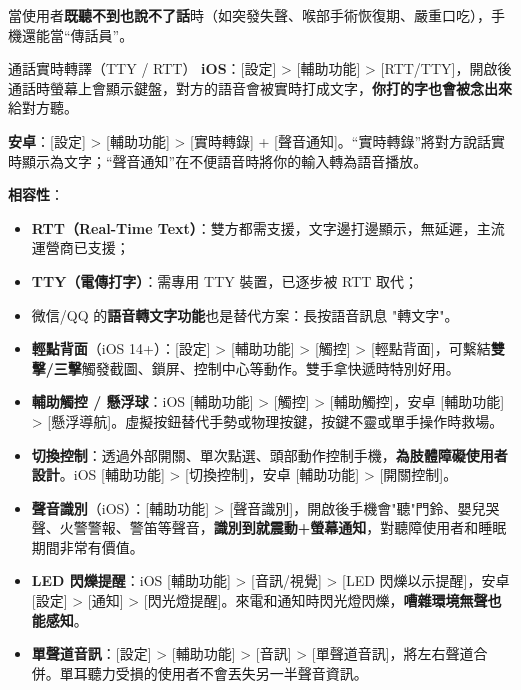
當使用者\textbf{既聽不到也說不了話}時（如突發失聲、喉部手術恢復期、嚴重口吃），手機還能當“傳話員”。

\begin{tcbinfo}{通話實時轉譯（TTY / RTT）}
\textbf{iOS}：[設定] > [輔助功能] > [RTT/TTY]，開啟後通話時螢幕上會顯示鍵盤，對方的語音會被實時打成文字，\textbf{你打的字也會被念出來}給對方聽。

\textbf{安卓}：[設定] > [輔助功能] > [實時轉錄] + [聲音通知]。“實時轉錄”將對方說話實時顯示為文字；“聲音通知”在不便語音時將你的輸入轉為語音播放。

\textbf{相容性}：

\begin{itemize}
  \item \textbf{RTT（Real-Time Text）}：雙方都需支援，文字邊打邊顯示，無延遲，主流運營商已支援；
  \item \textbf{TTY（電傳打字）}：需專用 TTY 裝置，已逐步被 RTT 取代；
  \item 微信/QQ 的\textbf{語音轉文字功能}也是替代方案：長按語音訊息 "轉文字"。
\end{itemize}

\end{tcbinfo}


\begin{itemize}
  \item \textbf{輕點背面}（iOS 14+）：[設定] > [輔助功能] > [觸控] > [輕點背面]，可繫結\textbf{雙擊/三擊}觸發截圖、鎖屏、控制中心等動作。雙手拿快遞時特別好用。
  \item \textbf{輔助觸控 / 懸浮球}：iOS [輔助功能] > [觸控] > [輔助觸控]，安卓 [輔助功能] > [懸浮導航]。虛擬按鈕替代手勢或物理按鍵，按鍵不靈或單手操作時救場。
  \item \textbf{切換控制}：透過外部開關、單次點選、頭部動作控制手機，\textbf{為肢體障礙使用者設計}。iOS [輔助功能] > [切換控制]，安卓 [輔助功能] > [開關控制]。
  \item \textbf{聲音識別}（iOS）：[輔助功能] > [聲音識別]，開啟後手機會"聽"門鈴、嬰兒哭聲、火警警報、警笛等聲音，\textbf{識別到就震動+螢幕通知}，對聽障使用者和睡眠期間非常有價值。
  \item \textbf{LED 閃爍提醒}：iOS [輔助功能] > [音訊/視覺] > [LED 閃爍以示提醒]，安卓 [設定] > [通知] > [閃光燈提醒]。來電和通知時閃光燈閃爍，\textbf{嘈雜環境無聲也能感知}。
  \item \textbf{單聲道音訊}：[設定] > [輔助功能] > [音訊] > [單聲道音訊]，將左右聲道合併。單耳聽力受損的使用者不會丟失另一半聲音資訊。
\end{itemize}

